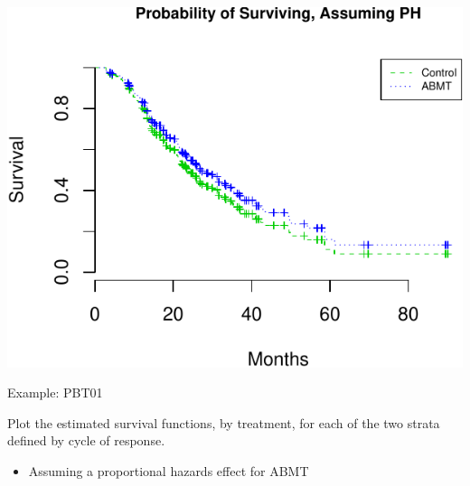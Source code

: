 \documentclass[ignorenonframetext,]{beamer}
\providecommand{\tightlist}{%
  \setlength{\itemsep}{0pt}\setlength{\parskip}{0pt}}
\begin{document}
\begin{frame}

\scriptsize

\includegraphics{unit_04_ph_reg_basics_files/figure-beamer/unnamed-chunk-16-1.pdf}

\end{frame}

\begin{frame}{%
\protect\hypertarget{example-pbt01-1}{%
Example: PBT01}}

Plot the estimated survival functions, by treatment, for each of the two
strata defined by cycle of response.

\begin{itemize}
\tightlist
\item
  Assuming a proportional hazards effect for ABMT
\end{itemize}

\end{frame}
\end{document}
